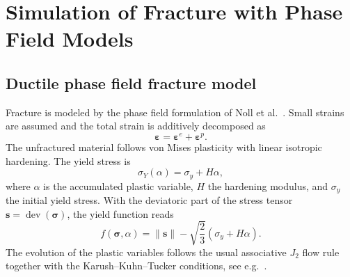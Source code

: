 \documentclass[pamm,a4paper,fleqn]{w-art}
\begin{document}
\section{Simulation of Fracture with Phase Field
  Models}\label{sec:simulation_phase_field_models}


\subsection{Ductile phase field fracture
  model}\label{sec:phase_field_model_ductile}

Fracture is modeled by the phase field
formulation of Noll et al.~\cite{noll_3d_2020}. Small strains are
assumed and the total strain is additively decomposed as
\begin{equation}
  \boldsymbol{\varepsilon} =
  \boldsymbol{\varepsilon}^e+\boldsymbol{\varepsilon}^p .
\end{equation}
The unfractured material follows von Mises plasticity with linear
isotropic hardening. The yield stress is
\begin{equation}
  \sigma_Y(\alpha)=\sigma_y+H\alpha,
\end{equation}
where \(\alpha\) is the accumulated plastic variable, \(H\) the
hardening modulus, and \(\sigma_y\) the initial yield stress. With
the deviatoric part of the stress tensor
\(\boldsymbol{s}=\operatorname{dev}(\boldsymbol{\sigma})\), the yield
function reads
\begin{equation}
  f(\boldsymbol{\sigma},\alpha)
  = \|\boldsymbol{s}\|
  - \sqrt{\frac{2}{3}}
  \left(\sigma_y+H\alpha\right).
\end{equation}
The evolution of the plastic variables follows the usual associative
\(J_2\) flow rule together with the Karush--Kuhn--Tucker
conditions, see e.g.~\cite{simo_computational_1998}.
\end{document}
